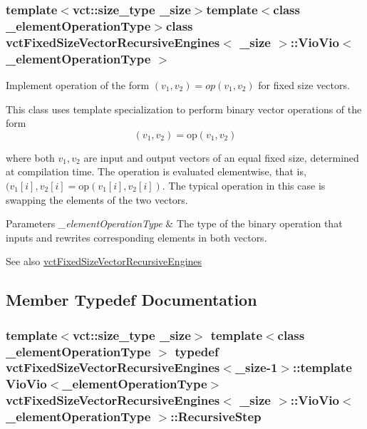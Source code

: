 \subsubsection*{template$<$vct\+::size\+\_\+type \+\_\+size$>$template$<$class \+\_\+element\+Operation\+Type$>$class vct\+Fixed\+Size\+Vector\+Recursive\+Engines$<$ \+\_\+size $>$\+::\+Vio\+Vio$<$ \+\_\+element\+Operation\+Type $>$}

Implement operation of the form $(v_{1}, v_{2}) = op(v_{1}, v_{2})$ for fixed size vectors. 

This class uses template specialization to perform binary vector operations of the form \[ (v_{1}, v_{2}) = \mathrm{op}(v_{1}, v_{2}) \]

where both $v_{1}, v_{2}$ are input and output vectors of an equal fixed size, determined at compilation time. The operation is evaluated elementwise, that is, $(v_{1}[i], v_{2}[i] = \mathrm{op}(v_{1}[i], v_{2}[i])$. The typical operation in this case is swapping the elements of the two vectors.


\begin{DoxyParams}{Parameters}
{\em \+\_\+element\+Operation\+Type} & The type of the binary operation that inputs and rewrites corresponding elements in both vectors.\\
\hline
\end{DoxyParams}
\begin{DoxySeeAlso}{See also}
\hyperlink{classvct_fixed_size_vector_recursive_engines}{vct\+Fixed\+Size\+Vector\+Recursive\+Engines} 
\end{DoxySeeAlso}


\subsection{Member Typedef Documentation}
\hypertarget{classvct_fixed_size_vector_recursive_engines_1_1_vio_vio_a90191766e286b1e089653e847b102a73}{}
\subsubsection[{Recursive\+Step}]{\setlength{\rightskip}{0pt plus 5cm}template$<$vct\+::size\+\_\+type \+\_\+size$>$ template$<$class \+\_\+element\+Operation\+Type $>$ typedef {\bf vct\+Fixed\+Size\+Vector\+Recursive\+Engines}$<$\+\_\+size-\/1$>$\+::template {\bf Vio\+Vio}$<$\+\_\+element\+Operation\+Type$>$ {\bf vct\+Fixed\+Size\+Vector\+Recursive\+Engines}$<$ \+\_\+size $>$\+::{\bf Vio\+Vio}$<$ \+\_\+element\+Operation\+Type $>$\+::{\bf Recursive\+Step}}\label{classvct_fixed_size_vector_recursive_engines_1_1_vio_vio_a90191766e286b1e089653e847b102a73}


